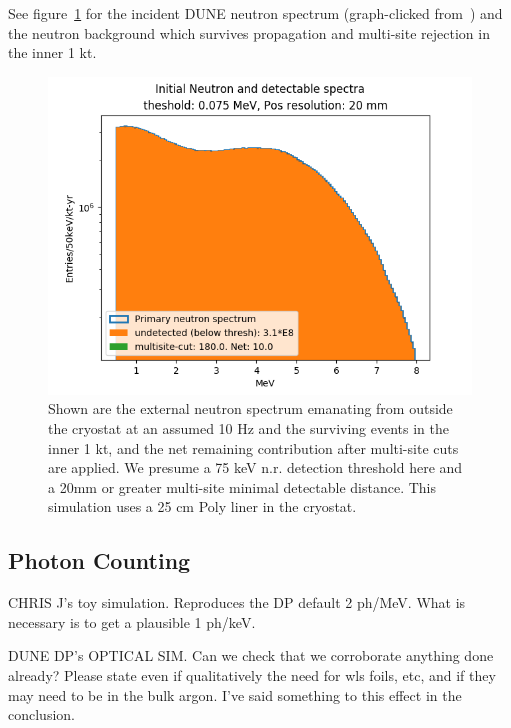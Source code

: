 \documentclass[a4paper,11pt]{article}
\begin{document}
See figure~\ref{fig:neutrons} for the incident DUNE neutron spectrum (graph-clicked from~\cite{bgd-taskforce}) and the neutron background which survives propagation and multi-site rejection in the inner 1 kt.

\begin{figure}[t]
\begin{centering}
\includegraphics[width=0.90\columnwidth]{Figures/NeutronKE_interact0075_20_dunedistn_25cmPoly.png}
\par\end{centering}

\caption{ Shown are the external neutron spectrum emanating from outside the cryostat at an assumed 10 Hz and the surviving events in the inner 1 kt, and the net remaining contribution after multi-site cuts are applied. We presume a 75 keV n.r. detection threshold here and a 20mm or greater multi-site minimal detectable distance. This simulation uses a 25 cm Poly liner in the cryostat.
\label{fig:neutrons}}
\end{figure}

\subsection{Photon Counting}
CHRIS J's toy simulation. 
Reproduces the DP default 2 ph/MeV.
What is necessary is to get a plausible 1 ph/keV.

DUNE DP's OPTICAL SIM. Can we check that we corroborate anything done already? Please state even if qualitatively the need for wls foils, etc, and if they may need to be in the bulk argon. I've said something to this effect in the conclusion.
\end{document}
